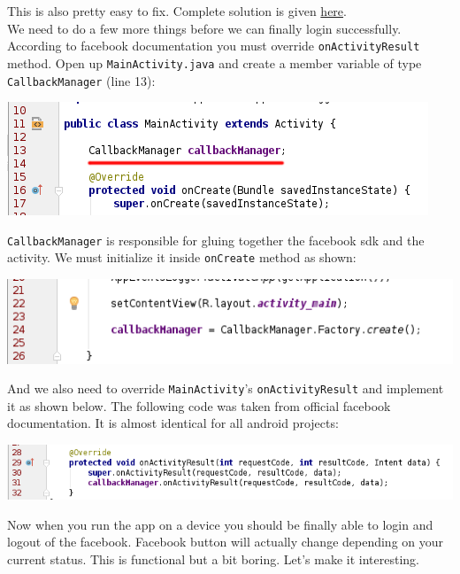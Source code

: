 This is also pretty easy to fix. Complete solution is given \href{http://stackoverflow.com/questions/23674131/android-facebook-integration-invalid-key-hash}{here}. \\

We need to do a few more things before we can finally login successfully. According to facebook documentation you must override \texttt{onActivityResult} method. Open up \texttt{MainActivity.java} and create a member variable of type \texttt{CallbackManager} (line 13):

\begin{center}
	\includegraphics[scale=\SourceCodeScale]{chapters/ch12/images/23}
\end{center}

\texttt{CallbackManager} is responsible for gluing together the facebook sdk and the activity. We must initialize it inside \texttt{onCreate} method as shown:

\begin{center}
	\includegraphics[scale=\SourceCodeScale]{chapters/ch12/images/24}
\end{center}

And we also need to override \texttt{MainActivity}'s \texttt{onActivityResult} and implement it as shown below. The following code was taken from official facebook documentation. It is almost identical for all android projects:

\begin{center}
	\includegraphics[scale=\SourceCodeScale]{chapters/ch12/images/25}
\end{center}

Now when you run the app on a device you should be finally able to login and logout of the facebook. Facebook button will actually change depending on your current status. This is functional but a bit boring. Let's make it interesting.

